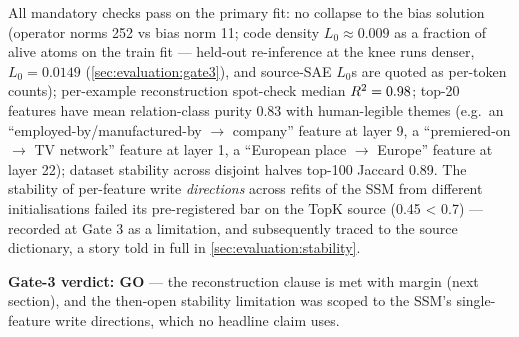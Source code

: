 All mandatory checks pass on the primary fit: no collapse to the bias
solution (operator norms 252 vs bias norm 11; code density $L_0 \approx
0.009$ as a fraction of alive atoms on the train fit --- held-out
re-inference at the knee runs denser, $L_0 = 0.0149$
(\cref{sec:evaluation:gate3}), and source-SAE $L_0$s are quoted as
per-token counts);
per-example reconstruction spot-check median $R^2 = 0.98$; top-20 features have
mean relation-class purity 0.83 with human-legible themes (e.g.\ an
``employed-by/manufactured-by $\to$ company'' feature at layer 9, a
``premiered-on $\to$ TV network'' feature at layer 1, a ``European place
$\to$ Europe'' feature at layer 22); dataset stability across disjoint halves
top-100 Jaccard 0.89. The stability of per-feature write \emph{directions}
across refits of the SSM from different initialisations failed its
pre-registered bar on the TopK source (0.45 < 0.7) --- recorded at Gate 3 as
a limitation, and subsequently traced to the source dictionary, a
story told in full in \cref{sec:evaluation:stability}.

\textbf{Gate-3 verdict: GO} --- the reconstruction clause is met with margin
(next section), and the then-open stability limitation was scoped to
the SSM's single-feature write directions, which no headline claim uses.

